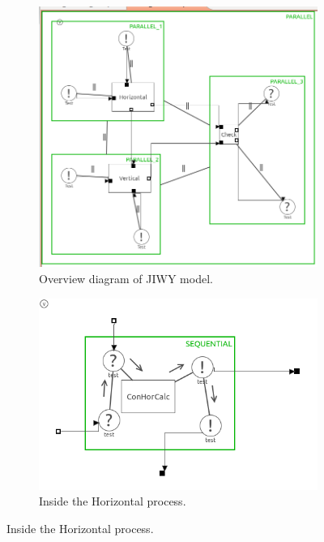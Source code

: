 \documentclass[a4paper,twoside,11pt]{article}
\begin{document}
\begin{figure}
	\begin{subfigure}{0.5\textwidth}
		\centering
		\includegraphics[width=\textwidth]{./images/4-1_overview.png}
		\caption{Overview diagram of JIWY model.}
		\label{sub:4_1_overview}
	\end{subfigure}%
	\begin{subfigure}{0.5\textwidth}
		\centering
		\includegraphics[width=\textwidth]{./images/4-1_hor.png}
		\caption{Inside the Horizontal process.}
		\label{sub:4_1_hor}
	\end{subfigure}%


\end{figure}
\end{document}
